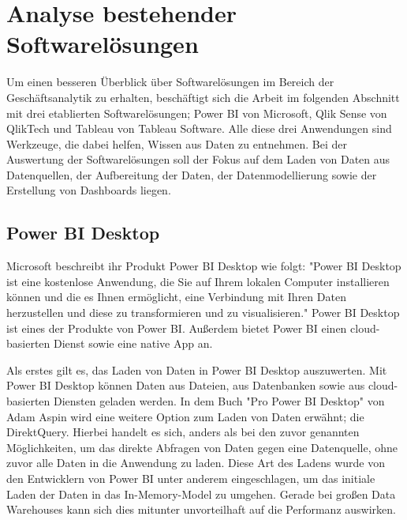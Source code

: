 \chapter{Analyse bestehender Softwarelösungen}
\label{chap:analysebestehendersoftwareloesungen}

Um einen besseren Überblick über Softwarelösungen im Bereich der Geschäftsanalytik zu erhalten, beschäftigt sich
die Arbeit im folgenden Abschnitt mit drei etablierten Softwarelösungen; Power BI von
Microsoft, Qlik Sense von QlikTech und Tableau von Tableau Software. Alle diese drei Anwendungen sind Werkzeuge,
die dabei helfen, Wissen aus Daten zu entnehmen. Bei der Auswertung der Softwarelösungen soll der Fokus auf dem Laden
von Daten aus Datenquellen, der Aufbereitung der Daten, der Datenmodellierung sowie der Erstellung von Dashboards liegen.

\section{Power BI Desktop}
\label{sec:powerbidesktop}

Microsoft beschreibt ihr Produkt Power BI Desktop wie folgt: "Power BI Desktop ist eine kostenlose Anwendung,
die Sie auf Ihrem lokalen Computer installieren können und die es Ihnen ermöglicht, eine Verbindung mit Ihren
Daten herzustellen und diese zu transformieren und zu visualisieren."\cite{MicrosoftPowerBIDesktopDocs}
Power BI Desktop ist eines der Produkte von Power BI. Außerdem bietet Power BI einen cloud-basierten Dienst
sowie eine native App an.\cite{WikiPowerBI}

Als erstes gilt es, das Laden von Daten in Power BI Desktop auszuwerten. Mit Power BI Desktop können
Daten aus Dateien, aus Datenbanken sowie aus cloud-basierten Diensten geladen werden. In dem Buch "Pro Power BI Desktop"
von Adam Aspin wird eine weitere Option zum Laden von Daten erwähnt; die DirektQuery.
Hierbei handelt es sich, anders als bei den zuvor genannten Möglichkeiten, um das direkte
Abfragen von Daten gegen eine Datenquelle, ohne zuvor alle Daten in die Anwendung zu laden.\cite[S. 111]{ProPowerBIDesktop}
Diese Art des Ladens wurde von den Entwicklern von Power BI unter anderem eingeschlagen,
um das initiale Laden der Daten in das In-Memory-Model zu umgehen. Gerade bei großen Data Warehouses
kann sich dies mitunter unvorteilhaft auf die Performanz auswirken.

